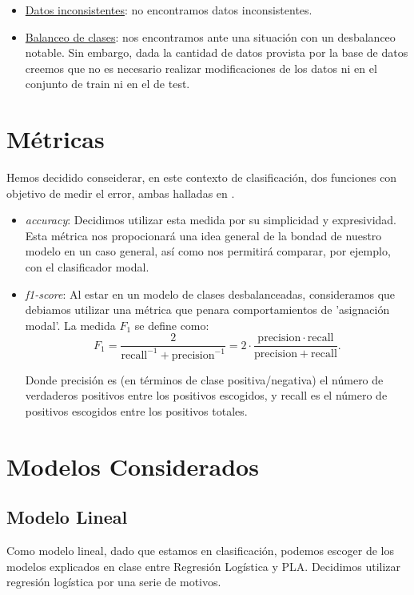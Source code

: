 \documentclass[11pt,a4paper]{article}
\begin{document}
\begin{itemize}
	\item \underline{Datos inconsistentes}: no encontramos datos inconsistentes.
	\item \underline{Balanceo de clases}: nos encontramos ante una situación con un desbalanceo notable. Sin embargo, dada la cantidad de datos provista por la base de datos creemos que no es necesario realizar modificaciones de los datos ni en el conjunto de train ni en el de test.
\end{itemize}




\section{ Métricas }

Hemos decidido conseiderar, en este contexto de clasificación, dos funciones con objetivo de medir el error, ambas halladas en \cite{met}.
\begin{itemize}
	\item \emph{accuracy}: Decidimos utilizar esta medida por su simplicidad y expresividad. Esta métrica nos propocionará una idea general de la bondad de nuestro modelo en un caso general, así como nos permitirá comparar, por ejemplo, con el clasificador modal. 
	\item \emph{f1-score}: Al estar en un modelo de clases desbalanceadas, consideramos que debiamos utilizar una métrica que penara comportamientos de 'asignación modal'. La medida $F_1$ se define como\cite{f1}:
	$${\displaystyle F_{1}={\frac {2}{\mathrm {recall} ^{-1}+\mathrm {precision} ^{-1}}}=2\cdot {\frac {\mathrm {precision} \cdot \mathrm {recall} }{\mathrm {precision} +\mathrm {recall} }}}.$$
	
	Donde precisión es (en términos de clase positiva/negativa) el número de verdaderos positivos entre los positivos escogidos, y recall es el número de positivos escogidos entre los positivos totales.
\end{itemize}
\section{ Modelos Considerados }

\subsection{ Modelo Lineal }
	
	Como modelo lineal, dado que estamos en clasificación, podemos escoger de los modelos explicados en clase entre Regresión Logística y  PLA. Decidimos utilizar regresión logística por una serie de motivos.
	
\end{document}

